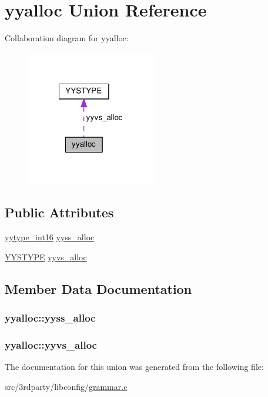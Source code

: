 \hypertarget{unionyyalloc}{\section{yyalloc Union Reference}
\label{unionyyalloc}
}


Collaboration diagram for yyalloc\-:\nopagebreak
\begin{figure}[H]
\begin{center}
\leavevmode
\includegraphics[width=161pt]{unionyyalloc__coll__graph}
\end{center}
\end{figure}
\subsection*{Public Attributes}
\begin{DoxyCompactItemize}
\item 
\hyperlink{grammar_8c_ade5b97f0021a4f6c5922ead3744ab297}{yytype\-\_\-int16} \hyperlink{unionyyalloc_a4800e0520a89a4789afa7b5d82197e65}{yyss\-\_\-alloc}
\item 
\hyperlink{unionYYSTYPE}{Y\-Y\-S\-T\-Y\-P\-E} \hyperlink{unionyyalloc_a9326f4fdc6f737a929444427836d8928}{yyvs\-\_\-alloc}
\end{DoxyCompactItemize}


\subsection{Member Data Documentation}
\hypertarget{unionyyalloc_a4800e0520a89a4789afa7b5d82197e65}{
\subsubsection[{yyss\-\_\-alloc}]{ yyalloc\-::yyss\-\_\-alloc}}\label{unionyyalloc_a4800e0520a89a4789afa7b5d82197e65}
\hypertarget{unionyyalloc_a9326f4fdc6f737a929444427836d8928}{
\subsubsection[{yyvs\-\_\-alloc}]{ yyalloc\-::yyvs\-\_\-alloc}}\label{unionyyalloc_a9326f4fdc6f737a929444427836d8928}


The documentation for this union was generated from the following file\-:\begin{DoxyCompactItemize}
\item 
src/3rdparty/libconfig/\hyperlink{grammar_8c}{grammar.\-c}\end{DoxyCompactItemize}
